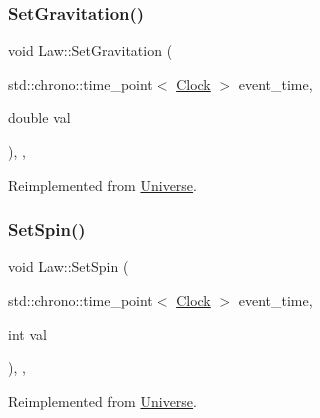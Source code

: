 \mbox{\label{classLaw_a908ccc2b0a561a7324a15393ec157219}} 
\subsubsection{\texorpdfstring{Set\+Gravitation()}{SetGravitation()}}
{\footnotesize\ttfamily void Law\+::\+Set\+Gravitation (\begin{DoxyParamCaption}\item[{std\+::chrono\+::time\+\_\+point$<$ \mbox{\hyperlink{universe_8h_a0ef8d951d1ca5ab3cfaf7ab4c7a6fd80}{Clock}} $>$}]{event\+\_\+time,  }\item[{double}]{val }\end{DoxyParamCaption})\hspace{0.3cm}{\ttfamily [inline]}, {\ttfamily [final]}, {\ttfamily [virtual]}}



Reimplemented from \mbox{\hyperlink{classUniverse_ae0cb8d86b2fbb8396d605160344b42f5}{Universe}}.

\mbox{\label{classLaw_a3de75edea5e20db0a7b731de61f07dea}} 
\subsubsection{\texorpdfstring{Set\+Spin()}{SetSpin()}}
{\footnotesize\ttfamily void Law\+::\+Set\+Spin (\begin{DoxyParamCaption}\item[{std\+::chrono\+::time\+\_\+point$<$ \mbox{\hyperlink{universe_8h_a0ef8d951d1ca5ab3cfaf7ab4c7a6fd80}{Clock}} $>$}]{event\+\_\+time,  }\item[{int}]{val }\end{DoxyParamCaption})\hspace{0.3cm}{\ttfamily [inline]}, {\ttfamily [final]}, {\ttfamily [virtual]}}



Reimplemented from \mbox{\hyperlink{classUniverse_ae2ae1c3b3e4cde2c18f5f6a814761ec8}{Universe}}.

\mbox{\label{classLaw_a4cd0dd1908edbd02090dd1ba1387d722}} 
